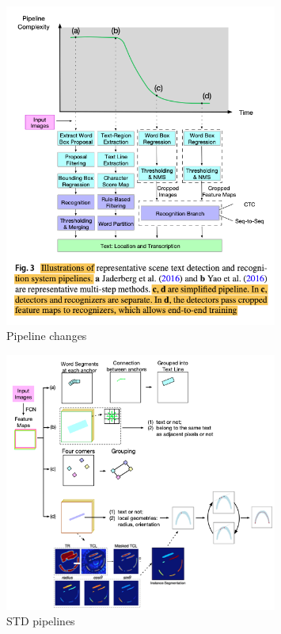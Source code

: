 \begin{figure}[h]
    \centering
    \includegraphics[width=0.80\textwidth]{img/Long-Scene-2021-Pipeline-Changes.png}
    \caption{Pipeline changes~\citep{long_scene_2021}\label{fig:piplineChanges}}
\end{figure}

\begin{figure}[h]
    \centering
    \includegraphics[width=0.80\textwidth]{img/Long-Scene-2021-STD-Pipelines.png}
    \caption{STD pipelines~\citep{long_scene_2021}\label{fig:STD-pipelines}}
\end{figure}

